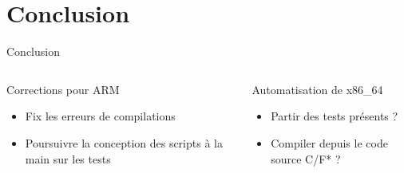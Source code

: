 \documentclass[A4,svgnames,9pt,aspectratio=169]{beamer}
\begin{document}

\section{Conclusion}
\frame{\sectionpage}

\begin{frame}{Conclusion}
  \begin{columns}
    \begin{column}{0.5\textwidth}
      \begin{block}{Corrections pour ARM}
        \begin{itemize}
          \item Fix les erreurs de compilations
          \item Poursuivre la conception des scripts à la main sur les tests
        \end{itemize}        
      \end{block}
    \end{column}
    \pause
    \begin{column}{0.5\textwidth}
      \vspace{0.5cm}
      \begin{block}{Automatisation de x86\_64}
        \begin{itemize}
          \item Partir des tests présents ?
          \item Compiler depuis le code source C/F* ?
        \end{itemize}        
      \end{block}
       
    \end{column}
  \end{columns}

\end{frame}


\frame{\merci}
\end{document}
